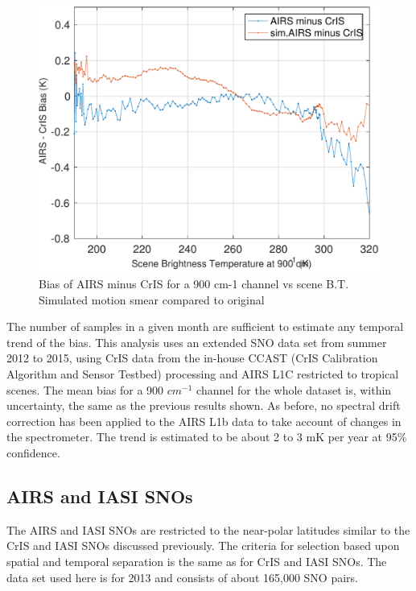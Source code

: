 \documentclass[twocolumn,10pt]{article}
\begin{document}
\begin{figure}[htb]
\centering
\includegraphics[width=\linewidth]{./figs/2013_AC_quantile_wSimAIRS.pdf}
\caption{\label{fig:orgparagraph18}
  Bias of AIRS minus CrIS for a 900 cm-1 channel vs scene B.T. Simulated motion smear compared to original}
\label{fig:Y8}
\end{figure}

The number of samples in a given month are sufficient to estimate any temporal trend of the bias. This analysis uses an extended SNO data set from summer 2012 to 2015, using CrIS data from the in-house CCAST (CrIS Calibration Algorithm and Sensor Testbed) processing \cite{Motteler2014} and AIRS L1C restricted to tropical scenes. The mean
bias for a 900 $cm^{-1}$ channel for the whole dataset is, within uncertainty, the same as the previous results shown. As before, no spectral drift correction has been applied to the AIRS L1b data to take account of changes in the spectrometer. The trend is estimated to be about 2 to 3 mK per year at 95\% confidence. 



\subsection{AIRS and IASI SNOs}
\label{sec:orgheadline10}
The AIRS and IASI SNOs are restricted to the near-polar latitudes similar to the 
CrIS and IASI SNOs discussed previously. The criteria for selection based upon spatial and temporal separation is the same as for CrIS and IASI SNOs. The data set used here is for 2013 and consists of about 165,000 SNO pairs. 
\end{document}
